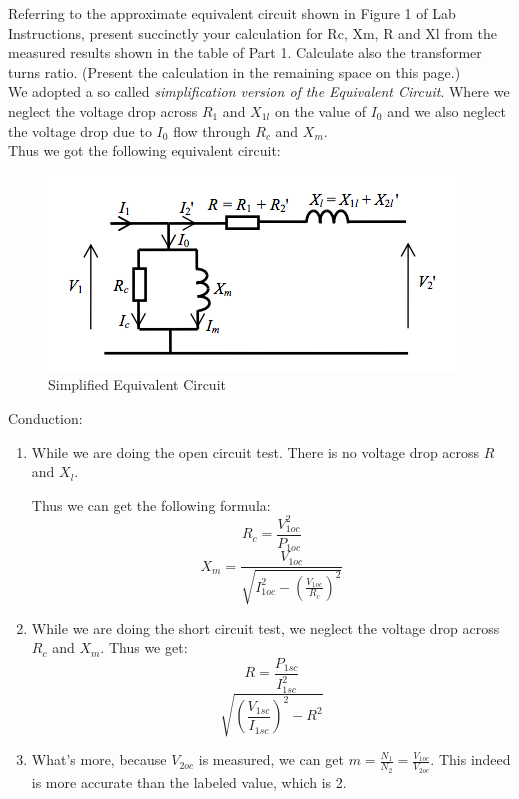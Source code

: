 \documentclass[11pt]{scrartcl}
\begin{document}
Referring to the approximate equivalent circuit shown in Figure 1 of Lab Instructions, present succinctly  your calculation for Rc, Xm, R and Xl  from the measured results shown in the table of Part 1. Calculate also the transformer turns ratio. (Present the calculation in the remaining space on this page.)\\

We adopted a so called \textit{simplification version of the Equivalent Circuit}. Where we neglect the voltage drop across $R_1$ and $X_{1l}$ on the value of $I_0$ and we also neglect the voltage drop due to $I_0$ flow through $R_c$ and $X_m$.\\
 
\FloatBarrier
Thus we got the following equivalent circuit:
\begin{figure}[h!]
\centering
\includegraphics[scale=0.8]{circuit.png}
\caption{Simplified Equivalent Circuit}
\label{img:S_circuit}
\end{figure}
\FloatBarrier

Conduction:\\
\begin{enumerate}
\item While we are doing the open circuit test. There is no voltage drop across $R$ and $X_l$.

Thus we can get the following formula:\\
\begin{equation}
R_c = \frac{V^2_{1oc}}{P_{1oc}}
\end{equation}
\begin{equation}
X_m = \frac{V_{1oc}}{\sqrt{I_{1oc}^2-\left( \frac{V_{1oc}}{R_c}\right)^2}}\end{equation}
\item While we are doing the short circuit test, we neglect the voltage drop across $R_c$ and $X_m$.
Thus we get:\\
\begin{equation}
R = \frac{P_{1sc}}{I_{1sc}^2}
\end{equation}
\begin{equation}
\sqrt{\left(\frac{V_{1sc}}{I_{1sc}}\right)^2-R^2}
\end{equation}

\item What's more, because $V_{2oc}$ is measured, we can get $m = \frac{N_1}{N_2} = \frac{V_{1oc}}{V_{2oc}}$. This indeed is more accurate than the labeled value, which is 2.
\end{enumerate}
\end{document}
